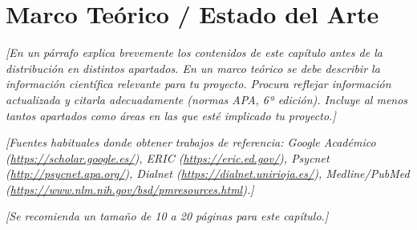 
\chapter{Marco Teórico / Estado del Arte}

\label{Chapter3}


\textit{[En un párrafo explica brevemente los contenidos de este capítulo antes de la distribución en distintos apartados. En un marco teórico se debe describir la información científica relevante para tu proyecto. Procura reflejar información actualizada y citarla adecuadamente (normas APA, 6ª edición). Incluye al menos tantos apartados como áreas en las que esté implicado tu proyecto.]}

\textit{[Fuentes habituales donde obtener trabajos de referencia: Google Académico (\url{https://scholar.google.es/}), ERIC (\url{https://eric.ed.gov/}), Psycnet (\url{http://psycnet.apa.org/}), Dialnet (\url{https://dialnet.unirioja.es/}), Medline/PubMed (\url{https://www.nlm.nih.gov/bsd/pmresources.html}).]}

\textit{[Se recomienda un tamaño de 10 a 20 páginas para este capítulo.]}


\section{}


\section{}


\section{}
